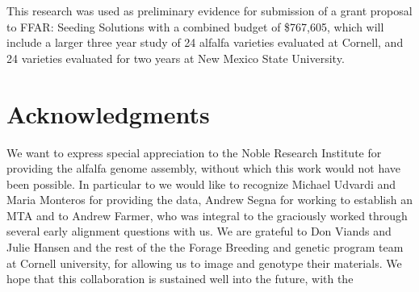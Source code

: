 \documentclass[12pt, letterpaper]{article}
\begin{document}
This research was used as preliminary evidence for submission of a grant proposal to FFAR: Seeding Solutions with a combined budget of \$767,605, which will include a larger three year study of 24 alfalfa varieties evaluated at Cornell, and 24 varieties evaluated for two years at New Mexico State University.




\section{Acknowledgments}

We want to express special appreciation to the Noble Research Institute for providing the alfalfa genome assembly, without which this work would not have been possible. In particular to we would like to recognize Michael Udvardi and Maria Monteros for providing the data, Andrew Segna for working to establish an MTA and to Andrew Farmer, who was integral to the graciously worked through several early alignment questions with us.  We are grateful to Don Viands and Julie Hansen and the rest of the  the Forage Breeding and genetic program team at Cornell university, for allowing us to image and genotype their materials. We hope that this collaboration is sustained well into the future, with the 


\printbibliography


\end{document}
